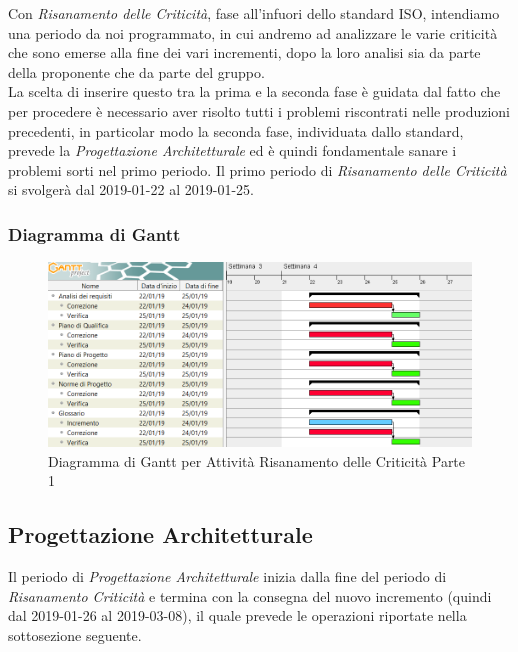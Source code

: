 Con \textit{Risanamento delle Criticità}, fase all'infuori dello standard ISO, intendiamo una periodo da noi programmato, in cui andremo ad analizzare le varie criticità che sono emerse alla fine dei vari incrementi, dopo la loro analisi sia da parte della proponente che da parte del gruppo. \\
La scelta di inserire questo tra la prima e la seconda fase è guidata dal fatto che per procedere è necessario aver risolto tutti i problemi riscontrati nelle produzioni precedenti, in particolar modo la seconda fase, individuata dallo standard, prevede la \textit{Progettazione Architetturale} ed è quindi fondamentale sanare i problemi sorti nel primo periodo. 
Il primo periodo di \textit{Risanamento delle Criticità} si svolgerà dal 2019-01-22 al 2019-01-25.

\subsubsection{Diagramma di Gantt}

\begin{figure}[h]
	\centering
  		\includegraphics[width=1.0\linewidth]{./images/RisanamentoCriticita1.png}
  		\caption{Diagramma di Gantt per Attività Risanamento delle Criticità Parte 1}
  		\label{fig:Gantt Risananmento Criticità 1}
\end{figure}

\newpage
\subsection{Progettazione Architetturale}
\label{PA}

Il periodo di \textit{Progettazione Architetturale} inizia dalla fine del periodo di \textit{Risanamento Criticità} e termina con la consegna del nuovo incremento (quindi dal 2019-01-26 al 2019-03-08), il quale prevede le operazioni riportate nella sottosezione seguente.

